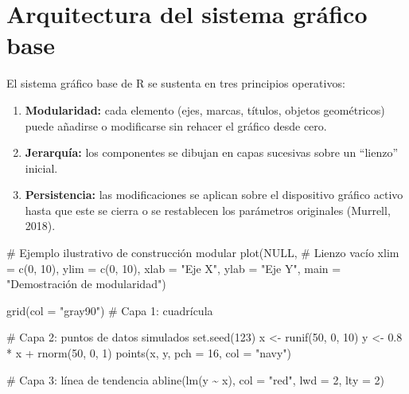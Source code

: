 \documentclass[
  spanish,
  a4paper,
  DIV=11,
  numbers=noendperiod,
  onepage,
  openany]{scrreprt}
\newenvironment{Shaded}{\begin{snugshade}}{\end{snugshade}}
\newcommand{\AttributeTok}[1]{\textcolor[rgb]{0.40,0.45,0.13}{#1}}
\newcommand{\CommentTok}[1]{\textcolor[rgb]{0.37,0.37,0.37}{#1}}
\newcommand{\ConstantTok}[1]{\textcolor[rgb]{0.56,0.35,0.01}{#1}}
\newcommand{\DecValTok}[1]{\textcolor[rgb]{0.68,0.00,0.00}{#1}}
\newcommand{\FloatTok}[1]{\textcolor[rgb]{0.68,0.00,0.00}{#1}}
\newcommand{\FunctionTok}[1]{\textcolor[rgb]{0.28,0.35,0.67}{#1}}
\newcommand{\NormalTok}[1]{\textcolor[rgb]{0.00,0.23,0.31}{#1}}
\newcommand{\OtherTok}[1]{\textcolor[rgb]{0.00,0.23,0.31}{#1}}
\newcommand{\SpecialCharTok}[1]{\textcolor[rgb]{0.37,0.37,0.37}{#1}}
\newcommand{\StringTok}[1]{\textcolor[rgb]{0.13,0.47,0.30}{#1}}
\begin{document}
\section{Arquitectura del sistema gráfico
base}\label{arquitectura-del-sistema-gruxe1fico-base}

El sistema gráfico base de R se sustenta en tres principios operativos:

\begin{enumerate}
\def\labelenumi{\arabic{enumi}.}
\item
  \textbf{Modularidad:} cada elemento (ejes, marcas, títulos, objetos
  geométricos) puede añadirse o modificarse sin rehacer el gráfico desde
  cero.
\item
  \textbf{Jerarquía:} los componentes se dibujan en capas sucesivas
  sobre un ``lienzo'' inicial.
\item
  \textbf{Persistencia:} las modificaciones se aplican sobre el
  dispositivo gráfico activo hasta que este se cierra o se restablecen
  los parámetros originales (Murrell, 2018).
\end{enumerate}

\begin{Shaded}
\begin{Highlighting}[]
\CommentTok{\# Ejemplo ilustrativo de construcción modular}
\FunctionTok{plot}\NormalTok{(}\ConstantTok{NULL}\NormalTok{,                         }\CommentTok{\# Lienzo vacío}
     \AttributeTok{xlim =} \FunctionTok{c}\NormalTok{(}\DecValTok{0}\NormalTok{, }\DecValTok{10}\NormalTok{), }\AttributeTok{ylim =} \FunctionTok{c}\NormalTok{(}\DecValTok{0}\NormalTok{, }\DecValTok{10}\NormalTok{),}
     \AttributeTok{xlab =} \StringTok{"Eje X"}\NormalTok{, }\AttributeTok{ylab =} \StringTok{"Eje Y"}\NormalTok{,}
     \AttributeTok{main =} \StringTok{"Demostración de modularidad"}\NormalTok{)}

\FunctionTok{grid}\NormalTok{(}\AttributeTok{col =} \StringTok{"gray90"}\NormalTok{)               }\CommentTok{\# Capa 1: cuadrícula}

\CommentTok{\# Capa 2: puntos de datos simulados}
\FunctionTok{set.seed}\NormalTok{(}\DecValTok{123}\NormalTok{)}
\NormalTok{x }\OtherTok{\textless{}{-}} \FunctionTok{runif}\NormalTok{(}\DecValTok{50}\NormalTok{, }\DecValTok{0}\NormalTok{, }\DecValTok{10}\NormalTok{)}
\NormalTok{y }\OtherTok{\textless{}{-}} \FloatTok{0.8} \SpecialCharTok{*}\NormalTok{ x }\SpecialCharTok{+} \FunctionTok{rnorm}\NormalTok{(}\DecValTok{50}\NormalTok{, }\DecValTok{0}\NormalTok{, }\DecValTok{1}\NormalTok{)}
\FunctionTok{points}\NormalTok{(x, y, }\AttributeTok{pch =} \DecValTok{16}\NormalTok{, }\AttributeTok{col =} \StringTok{"navy"}\NormalTok{)}

\CommentTok{\# Capa 3: línea de tendencia}
\FunctionTok{abline}\NormalTok{(}\FunctionTok{lm}\NormalTok{(y }\SpecialCharTok{\textasciitilde{}}\NormalTok{ x), }\AttributeTok{col =} \StringTok{"red"}\NormalTok{, }\AttributeTok{lwd =} \DecValTok{2}\NormalTok{, }\AttributeTok{lty =} \DecValTok{2}\NormalTok{)}
\end{Highlighting}
\end{Shaded}
\end{document}
